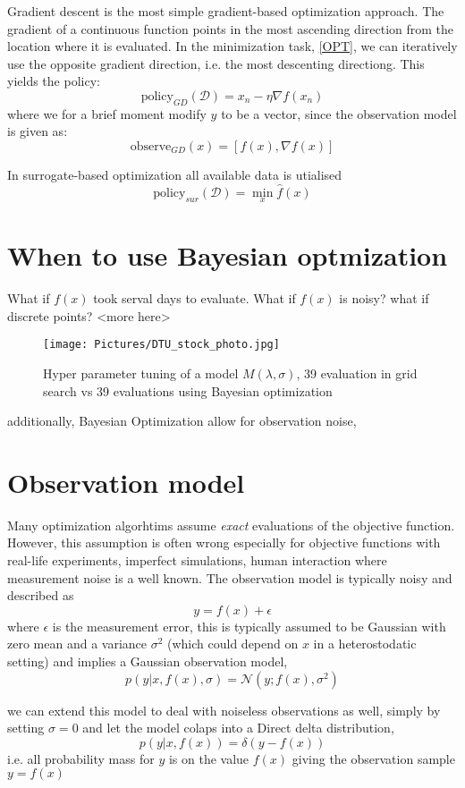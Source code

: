\begin{testexample}
    Gradient descent is the most simple gradient-based optimization approach. The gradient of a continuous 
    function points in the most ascending direction from the location where it is evaluated.
    In the minimization task, \eqref{OPT}, we can iteratively use the opposite gradient direction, i.e. the most 
    descenting directiong. This yields the policy:
    $$\text{policy}_{GD}(\mathcal{D}) = x_n - \eta \nabla f(x_n)$$
    where we for a brief moment modify $y$ to be a vector, since the observation model 
    is given as:
    $$\text{observe}_{GD}(x) = [f(x), \nabla f(x)]$$
\end{testexample}

\begin{testexample}
    In surrogate-based optimization all available data is utialised
    $$\text{policy}_{sur}(\mathcal{D}) = \min_x \hat f(x)$$

\end{testexample}

\section{When to use Bayesian optmization}
What if $f(x)$ took serval days to evaluate. What if $f(x)$ is noisy? what if discrete points? 
<more here>

\begin{figure}[h]
    \centering
    \texttt{[image: Pictures/DTU\_stock\_photo.jpg]}
    \caption{Hyper parameter tuning of a model $M(\lambda, \sigma)$, 
    39 evaluation in grid search vs 39 evaluations using Bayesian optimization}
    \label{optimhist}
\end{figure}

additionally, Bayesian Optimization allow for observation noise, 

\section{Observation model}\label{ObsModel}
Many optimization algorhtims assume \textit{exact} evaluations of the objective function. However, this assumption
is often wrong especially for objective functions with real-life experiments, imperfect simulations, human interaction 
where measurement noise is a well known. The observation model is typically noisy and described as
$$y = f(x)+\epsilon$$ where $\epsilon$ is the measurement error, this is
typically assumed to be Gaussian with zero mean and a variance
$\sigma^2$ (which could depend on $x$ in a heterostodatic setting) and implies a Gaussian observation model, 
$$p(y|x,f(x),\sigma) = \mathcal{N}(y;f(x),\sigma^2)$$ 

we can extend this model to deal with noiseless observations as well, simply by setting $\sigma = 0$ and let the
model colaps into a Direct delta distribution, 
$$p(y|x, f(x)) = \mathcal{\delta}(y-f(x))$$
i.e. all probability mass for $y$ is on the value $f(x)$ giving the observation sample $y = f(x)$


